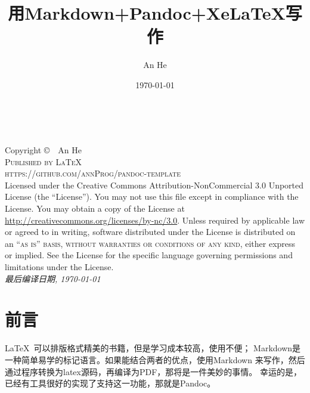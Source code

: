 \documentclass[fancyhdr,bookmark]{ctexbook}
\title{用Markdown+Pandoc+XeLaTeX写作}
\author{An He}
\date{\today}
\begin{document}
\frontmatter

\begingroup
\thispagestyle{empty}
\vfill
\endgroup
{}

\newpage
~\vfill
\thispagestyle{empty}

\noindent Copyright \copyright\ \the\year\  An He\\ %

\noindent \textsc{Published by \LaTeX}\\ %
\noindent \textsc{https://github.com/annProg/pandoc-template}\\ %

\noindent Licensed under the Creative Commons Attribution-NonCommercial 3.0 Unported License (the ``License''). You may not use this file except in compliance with the License. You may obtain a copy of the License at \url{http://creativecommons.org/licenses/by-nc/3.0}. Unless required by applicable law or agreed to in writing, software distributed under the License is distributed on an \textsc{``as is'' basis, without warranties or conditions of any kind}, either express or implied. See the License for the specific language governing permissions and limitations under the License.\\ %

\noindent \textit{最后编译日期, \today\ \currenttime } %


    
\chapter*{前言}
\LaTeX~可以排版格式精美的书籍，但是学习成本较高，使用不便；
Markdown是一种简单易学的标记语言。如果能结合两者的优点，使用Markdown
来写作，然后通过程序转换为latex源码，再编译为PDF，那将是一件美妙的事情。
幸运的是，已经有工具很好的实现了支持这一功能，那就是Pandoc。
\end{document}
